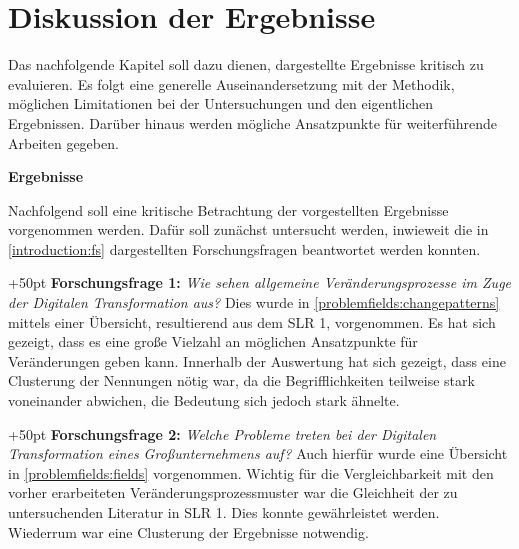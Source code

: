 \chapter{Diskussion der Ergebnisse}
\label{evaluation}


Das nachfolgende Kapitel soll dazu dienen, dargestellte Ergebnisse kritisch zu evaluieren. Es folgt eine generelle Auseinandersetzung mit der Methodik, möglichen Limitationen bei der Untersuchungen und den eigentlichen Ergebnissen. Darüber hinaus werden mögliche Ansatzpunkte für weiterführende Arbeiten gegeben.

\textbf{Ergebnisse}

Nachfolgend soll eine kritische Betrachtung der vorgestellten Ergebnisse vorgenommen werden. Dafür soll zunächst untersucht werden, inwieweit die in \ref{introduction:fs} dargestellten Forschungsfragen beantwortet werden konnten. 

\hangindent+50pt 
\textbf{Forschungsfrage 1:}\textit{ Wie sehen allgemeine Veränderungsprozesse im Zuge der Digitalen Transformation aus?} Dies wurde in  \ref{problemfields:changepatterns} mittels einer Übersicht, resultierend aus dem SLR 1, vorgenommen. Es hat sich gezeigt, dass es eine große Vielzahl an möglichen Ansatzpunkte für Veränderungen geben kann. Innerhalb der Auswertung hat sich gezeigt, dass eine Clusterung der Nennungen nötig war, da die Begrifflichkeiten teilweise stark voneinander abwichen, die Bedeutung sich jedoch stark ähnelte.  

\hangindent+50pt 
\textbf{Forschungsfrage 2:} \textit{Welche Probleme treten bei der Digitalen Transformation eines Großunternehmens auf?} Auch hierfür wurde eine Übersicht in \ref{problemfields:fields} vorgenommen. Wichtig für die Vergleichbarkeit mit den vorher erarbeiteten Veränderungsprozessmuster war die Gleichheit der zu untersuchenden Literatur in SLR 1. Dies konnte gewährleistet werden. Wiederrum war eine Clusterung der Ergebnisse notwendig.

